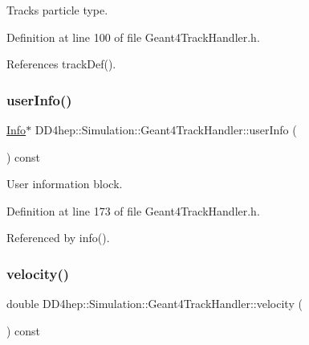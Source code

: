 Track\textquotesingle{}s particle type. 



Definition at line 100 of file Geant4\+Track\+Handler.\+h.



References track\+Def().

\hypertarget{class_d_d4hep_1_1_simulation_1_1_geant4_track_handler_a66ccd67b8130fe0311e38a21699d9b72}{}\label{class_d_d4hep_1_1_simulation_1_1_geant4_track_handler_a66ccd67b8130fe0311e38a21699d9b72} 
\subsubsection{\texorpdfstring{user\+Info()}{userInfo()}}
{\footnotesize\ttfamily \hyperlink{class_d_d4hep_1_1_simulation_1_1_geant4_track_handler_a0db29f37f6c64822f75c656ac27c03b4}{Info}$\ast$ D\+D4hep\+::\+Simulation\+::\+Geant4\+Track\+Handler\+::user\+Info (\begin{DoxyParamCaption}{ }\end{DoxyParamCaption}) const\hspace{0.3cm}{\ttfamily [inline]}}



User information block. 



Definition at line 173 of file Geant4\+Track\+Handler.\+h.



Referenced by info().

\hypertarget{class_d_d4hep_1_1_simulation_1_1_geant4_track_handler_aa190c53d0eebac9b69ec9112b6c23492}{}\label{class_d_d4hep_1_1_simulation_1_1_geant4_track_handler_aa190c53d0eebac9b69ec9112b6c23492} 
\subsubsection{\texorpdfstring{velocity()}{velocity()}}
{\footnotesize\ttfamily double D\+D4hep\+::\+Simulation\+::\+Geant4\+Track\+Handler\+::velocity (\begin{DoxyParamCaption}{ }\end{DoxyParamCaption}) const\hspace{0.3cm}{\ttfamily [inline]}}



